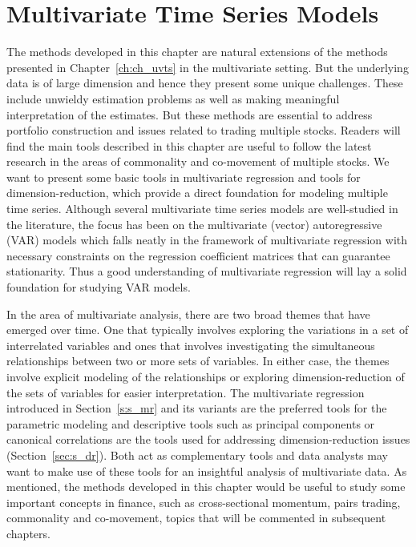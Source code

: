 \chapter{Multivariate Time Series Models\label{ch:ch_mvts}}

The methods developed in this chapter are natural extensions of the methods presented in Chapter~\ref{ch:ch_uvts} in the multivariate setting. But the underlying data is of large dimension and hence they present some unique challenges. These include unwieldy estimation problems as well as making meaningful interpretation of the estimates. But these methods are essential to address portfolio construction and issues related to trading multiple stocks. Readers will find the main tools described in this chapter are useful to follow the latest research in the areas of commonality and co-movement of multiple stocks. We want to present some basic tools in multivariate regression and tools for dimension-reduction, which provide a direct foundation for modeling multiple time series. Although several multivariate time series models are well-studied in the literature, the focus has been on the multivariate (vector) autoregressive (VAR) models which falls neatly in the framework of multivariate regression with necessary constraints on the regression coefficient matrices that can guarantee stationarity. Thus a good understanding of multivariate regression will lay a solid foundation for studying VAR models.


In the area of multivariate analysis, there are two broad themes that have emerged over time. One that typically involves exploring the variations in a set of interrelated variables and ones that involves investigating the simultaneous relationships between two or more sets of variables. In either case, the themes involve explicit modeling of the relationships or exploring dimension-reduction of the sets of variables for easier interpretation. The multivariate regression introduced in Section~\ref{s:s_mr} and its variants are the preferred tools for the parametric modeling and descriptive tools such as principal components or canonical correlations are the tools used for addressing dimension-reduction issues (Section~\ref{sec:s_dr}). Both act as complementary tools and data analysts may want to make use of these tools for an insightful analysis of multivariate data. As mentioned, the methods developed in this chapter would be useful to study some important concepts in finance, such as cross-sectional momentum, pairs trading, commonality and co-movement, topics that will be commented in subsequent chapters.




